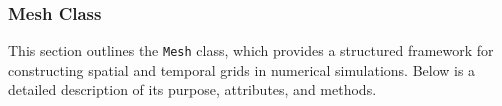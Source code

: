 \documentclass{article}
\begin{document}
			\begin{comment}
			
			\paragraph{Integration with the Wave Equation Solver}
			The \texttt{Problem} class is essential for the wave equation solver, providing the following:
			\begin{itemize}
				\item \textbf{Parameter Management:} Inherits from \texttt{Parameters} to manage and validate inputs like \texttt{L}, \texttt{c}, and \texttt{T}.
				\item \textbf{Exact Solution:} Supplies an analytical solution (\texttt{u\_exact}) for testing and validation.
				\item \textbf{Boundary and Initial Conditions:} Defines displacement (\texttt{I}), velocity (\texttt{V}), and boundary conditions (\texttt{U\_0}, \texttt{U\_L}).
			\end{itemize}
			
			The \texttt{Problem} class streamlines the process of initializing, solving, and validating the wave equation, ensuring consistency and reliability in numerical simulations.
			content...
			\end{comment}
		\subsubsection{Mesh Class}
		
			This section outlines the \texttt{Mesh} class, which provides a structured framework for constructing spatial and temporal grids in numerical simulations. Below is a detailed description of its purpose, attributes, and methods.
			
\end{document}

